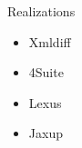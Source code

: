 \documentclass[sans]{beamer}
\begin{document}
\begin{frame}{Realizations}
	\begin{itemize}
		\item Xmldiff
		\item 4Suite
		\item Lexus
		\item Jaxup
	\end{itemize}
\end{frame}
\end{document}
